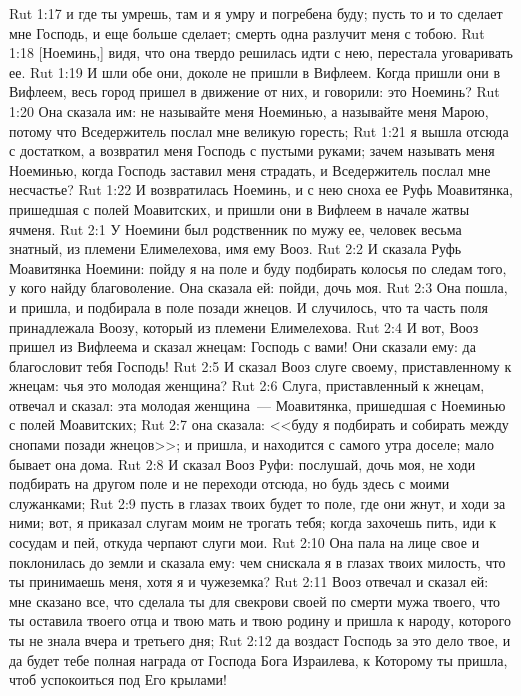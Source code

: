 \vs Rut 1:17 и где ты умрешь, там и я умру и погребена буду; пусть то и то сделает мне Господь, и еще больше сделает; смерть одна разлучит меня с тобою.
\vs Rut 1:18 [Ноеминь,] видя, что она твердо решилась идти с нею, перестала уговаривать ее.
\vs Rut 1:19 И шли обе они, доколе не пришли в Вифлеем. Когда пришли они в Вифлеем, весь город пришел в движение от них, и говорили: это Ноеминь?
\vs Rut 1:20 Она сказала им: не называйте меня Ноеминью, а называйте меня Марою, потому что Вседержитель послал мне великую горесть;
\vs Rut 1:21 я вышла отсюда с достатком, а возвратил меня Господь с пустыми руками; зачем называть меня Ноеминью, когда Господь заставил меня страдать, и Вседержитель послал мне несчастье?
\vs Rut 1:22 И возвратилась Ноеминь, и с нею сноха ее Руфь Моавитянка, пришедшая с полей Моавитских, и пришли они в Вифлеем в начале жатвы ячменя.
\vs Rut 2:1 У Ноемини был родственник по мужу ее, человек весьма знатный, из племени Елимелехова, имя ему Вооз.
\vs Rut 2:2 И сказала Руфь Моавитянка Ноемини: пойду я на поле и буду подбирать колосья по следам того, у кого найду благоволение. Она сказала ей: пойди, дочь моя.
\vs Rut 2:3 Она пошла, и пришла, и подбирала в поле  позади жнецов. И случилось, что та часть поля принадлежала Воозу, который из племени Елимелехова.
\vs Rut 2:4 И вот, Вооз пришел из Вифлеема и сказал жнецам: Господь с вами! Они сказали ему: да благословит тебя Господь!
\vs Rut 2:5 И сказал Вооз слуге своему, приставленному к жнецам: чья это молодая женщина?
\vs Rut 2:6 Слуга, приставленный к жнецам, отвечал и сказал: эта молодая женщина~--- Моавитянка, пришедшая с Ноеминью с полей Моавитских;
\vs Rut 2:7 она сказала: <<буду я подбирать и собирать между снопами позади жнецов>>; и пришла, и находится  с самого утра доселе; мало бывает она дома.
\vs Rut 2:8 И сказал Вооз Руфи: послушай, дочь моя, не ходи подбирать на другом поле и не переходи отсюда, но будь здесь с моими служанками;
\vs Rut 2:9 пусть в глазах твоих будет то поле, где они жнут, и ходи за ними; вот, я приказал слугам моим не трогать тебя; когда захочешь пить, иди к сосудам и пей, откуда черпают слуги мои.
\vs Rut 2:10 Она пала на лице свое и поклонилась до земли и сказала ему: чем снискала я в глазах твоих милость, что ты принимаешь меня, хотя я и чужеземка?
\vs Rut 2:11 Вооз отвечал и сказал ей: мне сказано все, что сделала ты для свекрови своей по смерти мужа твоего, что ты оставила твоего отца и твою мать и твою родину и пришла к народу, которого ты не знала вчера и третьего дня;
\vs Rut 2:12 да воздаст Господь за это дело твое, и да будет тебе полная награда от Господа Бога Израилева, к Которому ты пришла, чтоб успокоиться под Его крылами!
